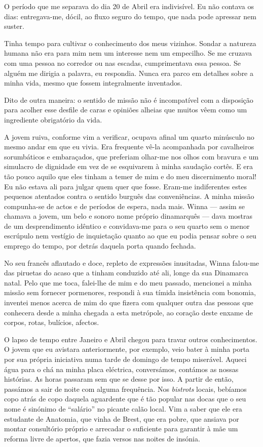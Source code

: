 O período que me separava do dia 20 de Abril era indivisível. Eu não
contava os dias: entregava-me, dócil, ao fluxo seguro do tempo, que nada
pode apressar nem suster.

Tinha tempo para cultivar o conhecimento dos meus vizinhos. Sondar a
natureza humana não era para mim nem um
interesse nem um empecilho. Se me cruzava com uma pessoa no corredor ou
nas escadas, cumprimentava essa pessoa. Se alguém me dirigia a
palavra, eu respondia. Nunca era parco em detalhes sobre a minha vida,
mesmo que fossem integralmente inventados.

Dito de outra maneira: o sentido de missão não é incompatível com a
disposição para acolher esse desfile de caras e opiniões alheias que
muitos vêem como um ingrediente obrigatório da vida.

A jovem ruiva, conforme vim a verificar, ocupava afinal um quarto
minúsculo no mesmo andar em que eu vivia. Era frequente vê-la
acompanhada por cavalheiros sorumbáticos e embaraçados, que preferiam
olhar-me nos olhos com bravura e um simulacro de dignidade em vez de se
esquivarem à minha saudação cortês. E era tão pouco aquilo que eles
tinham a temer de mim e do meu discernimento moral! Eu não estava ali
para julgar quem quer que fosse. Eram-me indiferentes estes pequenos
atentados contra o sentido burguês das conveniências. A minha missão
compunha-se de actos e de períodos de espera, nada mais. Winna ---
assim se chamava a jovem, um belo e sonoro nome próprio dinamarquês ---
dava mostras de um desprendimento idêntico e convidava-me para o seu
quarto sem o menor escrúpulo nem vestígio de inquietação quanto ao que
eu podia pensar sobre o seu emprego do tempo, por detrás daquela porta
quando fechada.

No seu francês aflautado e doce, repleto de expressões inusitadas,
Winna falou-me das piruetas do acaso que a tinham conduzido até ali,
longe da sua Dinamarca natal. Pelo que me toca, falei-lhe de mim e do
meu passado, mencionei a minha missão sem fornecer pormenores, respondi
à sua tímida insistência com bonomia, inventei menos acerca de mim do
que
fizera com qualquer outra das pessoas que conhecera desde a minha
chegada a esta metrópole, ao coração deste enxame de corpos, rotas,
bulícios, afectos.

O lapso de tempo entre Janeiro e Abril chegou para travar outros
conhecimentos. O jovem que eu avistara anteriormente, por exemplo,
veio bater à minha porta por sua própria iniciativa numa tarde de
domingo de tempo miserável. Aqueci água para o chá na minha placa
eléctrica, conversámos, contámos as nossas histórias. As horas passaram
sem que se desse por isso. A partir de então, passámos a sair de noite
com alguma frequência. Nos \emph{bistrots }locais, bebíamos copo atrás
de copo daquela aguardente que é tão popular nas docas que o seu nome é
sinónimo de ``salário'' no picante calão local. Vim a saber que ele era
estudante de Anatomia, que vinha de Brest, que era pobre, que ansiava
por montar consultório próprio e arrecadar o suficiente para garantir à
mãe um reforma livre de apertos, que fazia versos nas noites de insónia.

